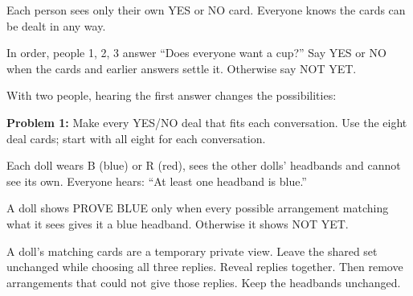 \documentclass[12pt,letterpaper]{article}
\newcommand\problem[2]{\textbf{Problem #1:} #2\par}
\newcommand\transcript[6]{%
 \draw[rounded corners=3pt] (#1,#2) rectangle ++(8.05,-2.9);
 \node[anchor=west,font=\bfseries\small] at (#1+0.3,#2-0.38) {Conversation #3};
 \foreach \i/\reply in {1/#4,2/#5,3/#6}{\node[anchor=west,font=\small] at (#1+0.4,#2-0.38-0.7*\i) {\i\quad \reply};}}
\begin{document}
\fontsize{13}{16}\selectfont
\raggedright
Each person sees only their own YES or NO card. Everyone knows the cards can be dealt in any way.

In order, people 1, 2, 3 answer ``Does everyone want a cup?'' Say YES or NO when the cards and earlier answers settle it. Otherwise say NOT YET.

With two people, hearing the first answer changes the possibilities:

\begin{center}
\end{center}

\problem{1}{Make every YES/NO deal that fits each conversation. Use the eight deal cards; start with all eight for each conversation.}
\begin{center}
\end{center}
\newpage
Each doll wears B (blue) or R (red), sees the other dolls' headbands and cannot see its own. Everyone hears: ``At least one headband is blue.''

A doll shows PROVE BLUE only when every possible arrangement matching what it sees gives it a blue headband. Otherwise it shows NOT YET.

A doll's matching cards are a temporary private view. Leave the shared set unchanged while choosing all three replies. Reveal replies together. Then remove arrangements that could not give those replies. Keep the headbands unchanged.
\end{document}
